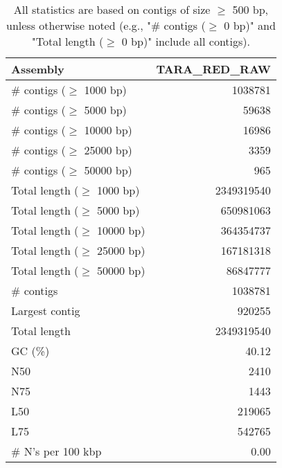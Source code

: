 \documentclass[12pt,a4paper]{article}
\begin{document}
\begin{table}[ht]
\begin{center}
\caption{All statistics are based on contigs of size $\geq$ 500 bp, unless otherwise noted (e.g., "\# contigs ($\geq$ 0 bp)" and "Total length ($\geq$ 0 bp)" include all contigs).}
\begin{tabular}{|l*{1}{|r}|}
\hline
Assembly & TARA\_RED\_RAW \\ \hline
\# contigs ($\geq$ 1000 bp) & 1038781 \\ \hline
\# contigs ($\geq$ 5000 bp) & 59638 \\ \hline
\# contigs ($\geq$ 10000 bp) & 16986 \\ \hline
\# contigs ($\geq$ 25000 bp) & 3359 \\ \hline
\# contigs ($\geq$ 50000 bp) & 965 \\ \hline
Total length ($\geq$ 1000 bp) & 2349319540 \\ \hline
Total length ($\geq$ 5000 bp) & 650981063 \\ \hline
Total length ($\geq$ 10000 bp) & 364354737 \\ \hline
Total length ($\geq$ 25000 bp) & 167181318 \\ \hline
Total length ($\geq$ 50000 bp) & 86847777 \\ \hline
\# contigs & 1038781 \\ \hline
Largest contig & 920255 \\ \hline
Total length & 2349319540 \\ \hline
GC (\%) & 40.12 \\ \hline
N50 & 2410 \\ \hline
N75 & 1443 \\ \hline
L50 & 219065 \\ \hline
L75 & 542765 \\ \hline
\# N's per 100 kbp & 0.00 \\ \hline
\end{tabular}
\end{center}
\end{table}
\end{document}

